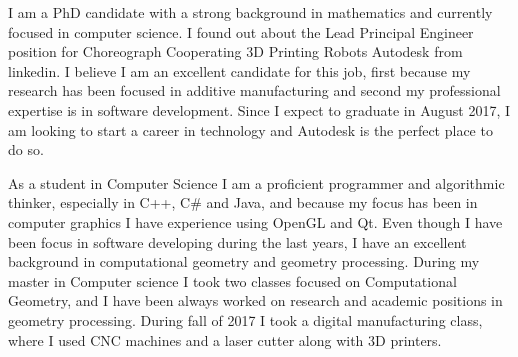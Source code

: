 \documentclass[10pt,stdletter,dateno,sigleft,letterpaper]{newlfm} %
\begin{document}
\begin{newlfm}



I am a PhD candidate with a strong background in mathematics and currently focused in computer science. I found out about the Lead Principal Engineer position for Choreograph Cooperating 3D Printing Robots Autodesk from linkedin. I believe I am an excellent candidate for this job, first because my research has been focused in additive manufacturing and second my professional expertise is in software development. Since I expect to graduate in August 2017, I am looking to start a career in technology and Autodesk is the perfect place to do so.

As a student in Computer Science I am a proficient programmer and algorithmic thinker, especially in C++, C\# and Java, and because my focus has been in computer graphics I have experience using OpenGL and Qt. Even though I have been focus in software developing during the last years, I have an excellent background in computational geometry and geometry processing. During my master in Computer science I took two classes focused on Computational Geometry, and I have been always worked on research and academic positions in geometry processing. During fall of 2017 I took a digital manufacturing class, where I used CNC machines and a laser cutter along with 3D printers.


\end{newlfm}
\end{document}
